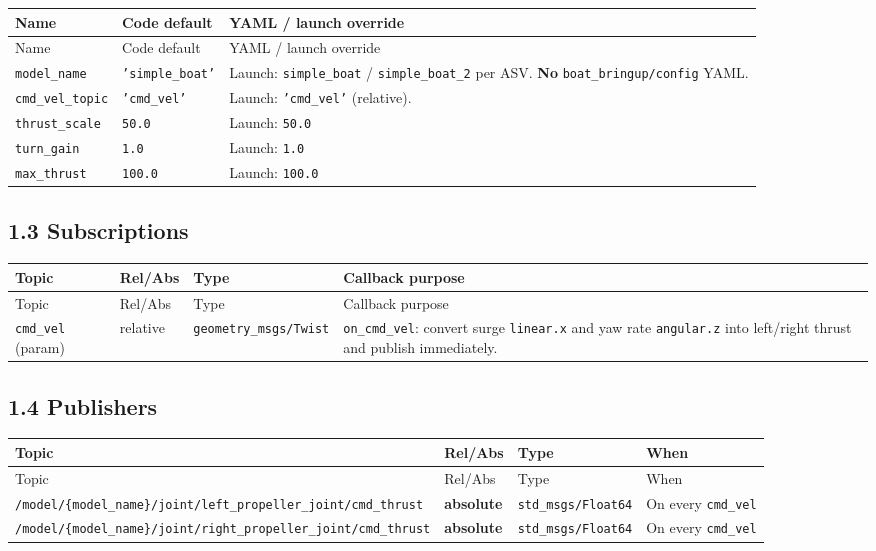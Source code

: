 \begin{center}
\small
\begin{longtable}{@{}llp{7.2cm}@{}}
\toprule
Name & Code default & YAML / launch override \\
\midrule
\endfirsthead
\toprule
Name & Code default & YAML / launch override \\
\midrule
\endhead
\texttt{model\_name} & \texttt{'simple\_boat'} & Launch: \texttt{simple\_boat} / \texttt{simple\_boat\_2} per ASV. \textbf{No} \texttt{boat\_bringup/config} YAML. \\
\texttt{cmd\_vel\_topic} & \texttt{'cmd\_vel'} & Launch: \texttt{'cmd\_vel'} (relative). \\
\texttt{thrust\_scale} & \texttt{50.0} & Launch: \texttt{50.0} \\
\texttt{turn\_gain} & \texttt{1.0} & Launch: \texttt{1.0} \\
\texttt{max\_thrust} & \texttt{100.0} & Launch: \texttt{100.0} \\
\bottomrule
\end{longtable}
\end{center}


\subsection{1.3 Subscriptions}


\begin{center}
\small
\begin{longtable}{@{}lllp{5.2cm}@{}}
\toprule
Topic & Rel/Abs & Type & Callback purpose \\
\midrule
\endfirsthead
\toprule
Topic & Rel/Abs & Type & Callback purpose \\
\midrule
\endhead
\texttt{cmd\_vel} (param) & relative & \texttt{geometry\_msgs/Twist} & \texttt{on\_cmd\_vel}: convert surge \texttt{linear.x} and yaw rate \texttt{angular.z} into left/right thrust and publish immediately. \\
\bottomrule
\end{longtable}
\end{center}


\subsection{1.4 Publishers}


\begin{center}
\small
\begin{longtable}{@{}lllp{5.2cm}@{}}
\toprule
Topic & Rel/Abs & Type & When \\
\midrule
\endfirsthead
\toprule
Topic & Rel/Abs & Type & When \\
\midrule
\endhead
\texttt{/model/\{model\_name\}/joint/left\_propeller\_joint/cmd\_thrust} & \textbf{absolute} & \texttt{std\_msgs/Float64} & On every \texttt{cmd\_vel} \\
\texttt{/model/\{model\_name\}/joint/right\_propeller\_joint/cmd\_thrust} & \textbf{absolute} & \texttt{std\_msgs/Float64} & On every \texttt{cmd\_vel} \\
\bottomrule
\end{longtable}
\end{center}


